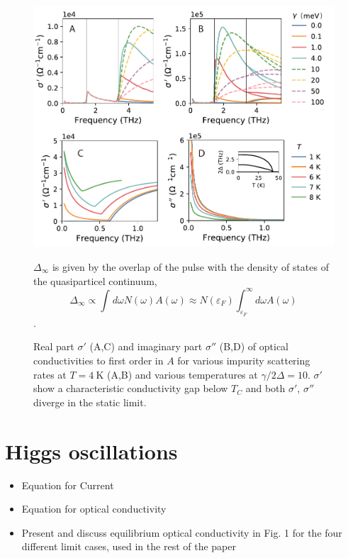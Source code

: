 \documentclass[aps,prb,reprint,noeprint,superscriptaddress]{revtex4-1}
\begin{document}
\begin{figure}[ht]
	\centering
	\includegraphics[width=\columnwidth]{figures/m-fig1.pdf}

	\caption{Real part $\sigma'$ (A,C) and imaginary part $\sigma''$ (B,D)
		of optical conductivities to first order in $A$ 
	for various impurity scattering rates at $T=\SI{4}{\kelvin}$ (A,B) and
various temperatures at $\gamma/2\Delta=10$. $\sigma'$ show a characteristic
conductivity gap below $T_C$ and both $\sigma'$, $\sigma''$ diverge in the
static limit.}
	
$\Delta_{\infty}$ is given by the overlap of the pulse with the density of
states of the quasiparticel continuum, 
$$\Delta_{\infty} \propto
\int_{}^{}d\omega N(\omega) A(\omega) \approx N(\varepsilon_F)
\int_{\varepsilon_F}^{\infty}d\omega A(\omega)$$.
\label{fig:singleband-gap}
\end{figure}

\section{Higgs oscillations}
\label{sec:higgs_oscillations}

\begin{itemize}
	\item Equation for Current
	\item Equation for optical conductivity
	\item Present and discuss equilibrium optical conductivity in Fig. 1 for the four different limit cases, used in the rest of the paper
\end{itemize}
\end{document}
